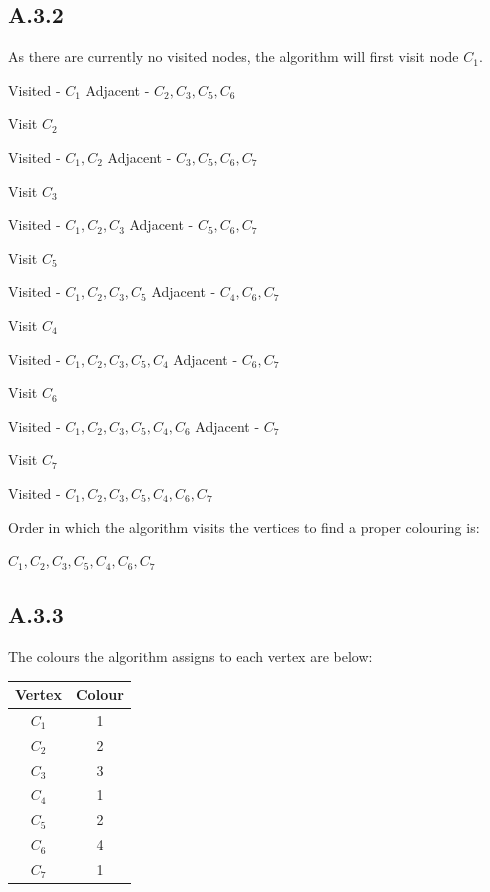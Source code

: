 \documentclass{article}
\begin{document}
\subsection*{A.3.2}
As there are currently no visited nodes, the algorithm will first visit node $C_1$.
\begin{center}
Visited - $C_1$
\newline
Adjacent - $C_2,C_3,C_5,C_6$
\newline
\end{center}
Visit $C_2$
\begin{center}
Visited - $C_1,C_2$
\newline
Adjacent - $C_3,C_5,C_6,C_7$
\newline
\end{center}
Visit $C_3$
\begin{center}
Visited - $C_1,C_2,C_3$
\newline
Adjacent - $C_5,C_6,C_7$
\newline
\end{center}
Visit $C_5$
\begin{center}
Visited - $C_1,C_2,C_3,C_5$
\newline
Adjacent - $C_4,C_6,C_7$
\newline
\end{center}
Visit $C_4$
\begin{center}
Visited - $C_1,C_2,C_3,C_5,C_4$
\newline
Adjacent - $C_6,C_7$
\end{center}
Visit $C_6$
\begin{center}
Visited - $C_1,C_2,C_3,C_5,C_4,C_6$
\newline
Adjacent - $C_7$
\end{center}
Visit $C_7$
\begin{center}
Visited - $C_1,C_2,C_3,C_5,C_4,C_6,C_7$
\newline
\end{center}
Order in which the algorithm visits the vertices to find a proper colouring is:
\newline
\begin{center}
$C_1,C_2,C_3,C_5,C_4,C_6,C_7$
\end{center}
\subsection*{A.3.3}
The colours the algorithm assigns to each vertex are below:
\begin{center}
\begin{tabular}{ |c|c| }
\hline
Vertex & Colour \\
\hline
$C_1$  & 1      \\
$C_2$  & 2      \\
$C_3$  & 3      \\
$C_4$  & 1      \\
$C_5$  & 2      \\
$C_6$  & 4      \\
$C_7$  & 1       \\
\hline
\end{tabular}
\end{center}
\end{document}

